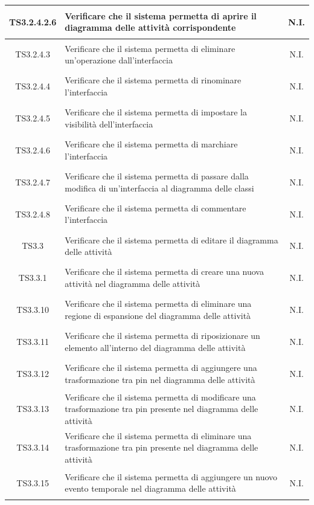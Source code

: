 \documentclass[../PianoDiQualifica.tex]{subfiles}
\begin{document}
\begin{longtable}{|c|>{\centering}p{10cm}|c|}
	\hline
	\hypertarget{TS3.2.4.2.6}{TS3.2.4.2.6} & Verificare che il sistema permetta di aprire il diagramma delle attività corrispondente & N.I. \\
	\hline
	\hypertarget{TS3.2.4.3}{TS3.2.4.3} & Verificare che il sistema permetta di eliminare un'operazione dall'interfaccia & N.I. \\
	\hline
	\hypertarget{TS3.2.4.4}{TS3.2.4.4} & Verificare che il sistema permetta di rinominare l'interfaccia & N.I. \\
	\hline
	\hypertarget{TS3.2.4.5}{TS3.2.4.5} & Verificare che il sistema permetta di impostare la visibilità dell'interfaccia & N.I. \\
	\hline
	\hypertarget{TS3.2.4.6}{TS3.2.4.6} & Verificare che il sistema permetta di marchiare l'interfaccia & N.I. \\
	\hline
	\hypertarget{TS3.2.4.7}{TS3.2.4.7} & Verificare che il sistema permetta di passare dalla modifica di un'interfaccia al diagramma delle classi & N.I. \\
	\hline
	\hypertarget{TS3.2.4.8}{TS3.2.4.8} & Verificare che il sistema permetta di commentare l'interfaccia & N.I. \\
	\hline
	\hypertarget{TS3.3}{TS3.3} & Verificare che il sistema permetta di editare il diagramma delle attività & N.I. \\
	\hline
	\hypertarget{TS3.3.1}{TS3.3.1} & Verificare che il sistema permetta di creare una nuova attività nel diagramma delle attività & N.I. \\
	\hline
	\hypertarget{TS3.3.10}{TS3.3.10} & Verificare che il sistema permetta di eliminare una regione di espansione del diagramma delle attività & N.I. \\
	\hline
	\hypertarget{TS3.3.11}{TS3.3.11} & Verificare che il sistema permetta di riposizionare un elemento all'interno del diagramma delle attività & N.I. \\
	\hline
	\hypertarget{TS3.3.12}{TS3.3.12} & Verificare che il sistema permetta di aggiungere una trasformazione tra pin nel diagramma delle attività & N.I. \\
	\hline
	\hypertarget{TS3.3.13}{TS3.3.13} & Verificare che il sistema permetta di modificare una trasformazione tra pin presente nel diagramma delle attività & N.I. \\
	\hline
	\hypertarget{TS3.3.14}{TS3.3.14} & Verificare che il sistema permetta di eliminare una trasformazione tra pin presente nel diagramma delle attività & N.I. \\
	\hline
	\hypertarget{TS3.3.15}{TS3.3.15} & Verificare che il sistema permetta di aggiungere un nuovo evento temporale nel diagramma delle attività & N.I. \\

\end{longtable}
\end{document}
